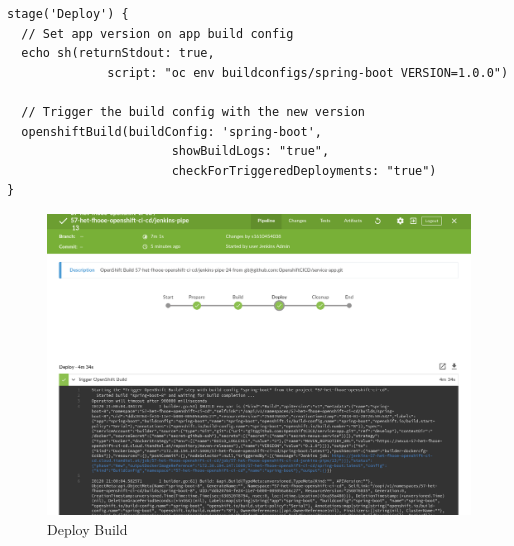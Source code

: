 \begin{verbatim}
stage('Deploy') {
  // Set app version on app build config
  echo sh(returnStdout: true, 
              script: "oc env buildconfigs/spring-boot VERSION=1.0.0")

  // Trigger the build config with the new version
  openshiftBuild(buildConfig: 'spring-boot', 
                       showBuildLogs: "true", 
                       checkForTriggeredDeployments: "true")
}
\end{verbatim}

\begin{figure}[H]
	\centering
	\includegraphics[scale=0.4]{image/jenkins-deploy.png}
	\caption{Deploy Build}
	\label{fig:architecture}
\end{figure}